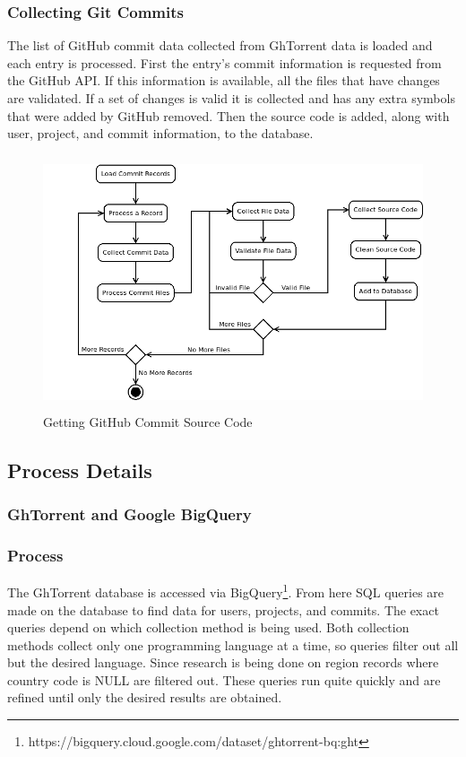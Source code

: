 \documentclass[12pt]{article}
\begin{document}
\subsubsection*{Collecting Git Commits}
The list of GitHub commit data collected from GhTorrent data is loaded and each entry is processed. First the entry's commit information is requested from the GitHub API. If this information is available, all the files that have changes are validated. If a set of changes is valid it is collected and has any extra symbols that were added by GitHub removed. Then the source code is added, along with user, project, and commit information, to the database.

\begin{figure}[t]
    \centering
    \includegraphics[height=7.5cm]{diagrams/commits.png}
    \caption{Getting GitHub Commit Source Code}
\end{figure}


\subsection{Process Details}


\subsubsection{GhTorrent and Google BigQuery}

\subsubsection*{Process}
The GhTorrent database is accessed via BigQuery\footnote{https://bigquery.cloud.google.com/dataset/ghtorrent-bq:ght}. From here SQL queries are made on the database to find data for users, projects, and commits. The exact queries depend on which collection method is being used. Both collection methods collect only one programming language at a time, so queries filter out all but the desired language. Since research is being done on region records where country code is NULL are filtered out. These queries run quite quickly and are refined until only the desired results are obtained.
\end{document}
